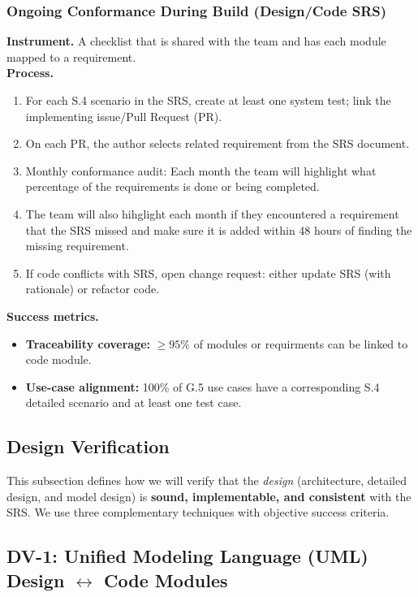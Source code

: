 \documentclass[12pt, titlepage]{article}
\begin{document}
\subsubsection*{Ongoing Conformance During Build (Design/Code \textrightarrow{} SRS)}
\textbf{Instrument.} A checklist that is shared with the team and has each module mapped to a requirement. \\
\textbf{Process.}
\begin{enumerate}
  \item For each S.4 scenario in the SRS, create at least one system test; link the implementing issue/Pull Request (PR).
  \item On each PR, the author selects related requirement from the SRS document.
  \item Monthly conformance audit: Each month the team will highlight what percentage of the requirements is done or being completed.
  \item The team will also hihglight each month if they encountered a requirement that the SRS missed and make sure it is added within 48 hours of finding the missing requirement.
  \item If code conflicts with SRS, open change request: either update SRS (with rationale) or refactor code.
\end{enumerate}
\textbf{Success metrics.}
\begin{itemize}
  \item \textbf{Traceability coverage:} $\geq 95\%$ of modules or requirments can be linked to code module.
  \item \textbf{Use-case alignment:} 100\% of G.5 use cases have a corresponding S.4 detailed scenario and at least one test case.
\end{itemize}


\subsection{Design Verification}

This subsection defines how we will verify that the \emph{design} (architecture, detailed design, and model design) is
\textbf{sound, implementable, and consistent} with the SRS. We use three complementary techniques with objective
success criteria.

\subsection*{DV-1: Unified Modeling Language (UML) Design \texorpdfstring{$\leftrightarrow$}{↔} Code Modules}
\end{document}
